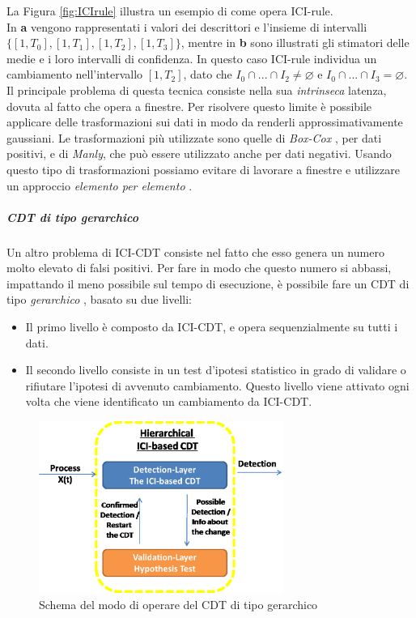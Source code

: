 La Figura \ref{fig:ICIrule} illustra un esempio di come opera ICI-rule.\\
In \textbf{a} vengono rappresentati i valori dei descrittori e l'insieme di intervalli $\{[1,T_0], [1,T_1], [1,T_2], [1,T_3]\}$, mentre in \textbf{b} sono illustrati gli stimatori delle medie e i loro intervalli di confidenza. In questo caso ICI-rule individua un cambiamento nell'intervallo $[1,T_2]$, dato che $I_0 \cap ...\cap I_2 \neq \varnothing$ e $I_0 \cap ...\cap I_3 = \varnothing$.\\
Il principale problema di questa tecnica consiste nella sua \textit{intrinseca} latenza, dovuta al fatto che opera a finestre. 
Per risolvere questo limite \`e possibile applicare delle trasformazioni sui dati in modo da renderli approssimativamente gaussiani. Le trasformazioni pi\`u utilizzate sono quelle di \textit{Box-Cox}   \cite{box1964analysis}, per dati positivi, e di \textit{Manly}, \cite{manly1976exponential} che pu\`o essere utilizzato anche per dati negativi. Usando questo tipo di trasformazioni possiamo evitare di lavorare a finestre e utilizzare un approccio \textit{elemento  per elemento} \cite{boracchi2014reconfigurable}.           
\subparagraph{CDT di tipo gerarchico} 
Un altro problema di ICI-CDT consiste nel fatto che esso genera un numero molto elevato di falsi positivi. Per fare in modo che questo numero si abbassi, impattando il meno possibile sul tempo di esecuzione, \`e possibile fare un CDT di tipo \textit{gerarchico} \cite{alippi2011hierarchical}, basato su due livelli:
\begin{itemize}
	\item Il primo livello \`e composto da ICI-CDT, e opera sequenzialmente su tutti i dati.
	\item Il secondo livello consiste in un test d'ipotesi statistico in grado di validare o rifiutare l'ipotesi di avvenuto cambiamento. Questo livello viene attivato ogni volta che viene identificato un cambiamento da ICI-CDT.
\end{itemize}
\begin{figure}
	\centering
	\includegraphics[width=8cm,keepaspectratio]{pictures/Hierarchical_ICI_based_CDT_Scheme}
	\caption{Schema del modo di operare del CDT di tipo gerarchico}
	\label{fig:HierarchicalCDT}
\end{figure}
